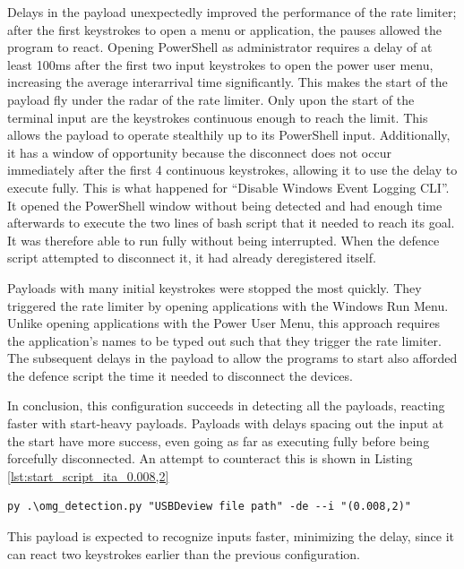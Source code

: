 Delays in the payload unexpectedly improved the performance of the rate limiter; after the first keystrokes to open a menu or application, the pauses allowed the program to react. Opening PowerShell as administrator requires a delay of at least 100ms after the first two input keystrokes to open the power user menu, increasing the average interarrival time significantly. This makes the start of the payload fly under the radar of the rate limiter. Only upon the start of the terminal input are the keystrokes continuous enough to reach the limit. This allows the payload to operate stealthily up to its PowerShell input. Additionally, it has a window of opportunity because the disconnect does not occur immediately after the first 4 continuous keystrokes, allowing it to use the delay to execute fully. This is what happened for ``Disable Windows Event Logging CLI''. It opened the PowerShell window without being detected and had enough time afterwards to execute the two lines of bash script that it needed to reach its goal. It was therefore able to run fully without being interrupted. When the defence script attempted to disconnect it, it had already deregistered itself. 

Payloads with many initial keystrokes were stopped the most quickly. They triggered the rate limiter by opening applications with the Windows Run Menu. Unlike opening applications with the Power User Menu, this approach requires the application's names to be typed out such that they trigger the rate limiter. The subsequent delays in the payload to allow the programs to start also afforded the defence script the time it needed to disconnect the devices.  

In conclusion, this configuration succeeds in detecting all the payloads, reacting faster with start-heavy payloads. Payloads with delays spacing out the input at the start have more success, even going as far as executing fully before being forcefully disconnected. An attempt to counteract this is shown in Listing  \ref{lst:start_script_ita_0.008,2}   

\begin{lstlisting}[caption={start defence Script with ITA (0.008,2)},label={lst:start_script_ita_0.008,2}, captionpos=b]
 py .\omg_detection.py "USBDeview file path" -de --i "(0.008,2)"
\end{lstlisting}

This payload is expected to recognize inputs faster, minimizing the delay, since it can react two keystrokes earlier than the previous configuration. 

